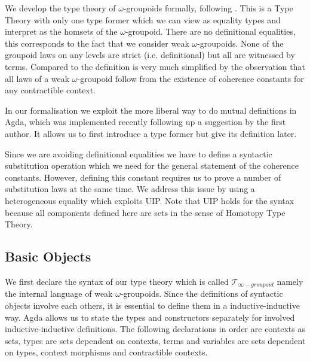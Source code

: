 \documentclass{acm_proc_article-sp}
\newcommand{\wog}{weak $\omega$-groupoids}
\newcommand{\tig}{$\mathcal{T}_{\infty-groupoid}$}
\begin{document}
We develop the type theory of $\omega$-groupoids formally, following
\cite{gb:wog}. This is a Type Theory with only one type former which
we can view as equality types and interpret as the homsets of the
$\omega$-groupoid. There are no definitional equalities, this
corresponds to the fact that we consider weak $\omega$-groupoids. None of the groupoid laws on any levels are strict (i.e. definitional) but all are witnessed by
terms. Compared to \cite{txa:csl} the definition is very much
simplified by the observation that all laws of a weak $\omega$-groupoid follow from the existence of coherence constants for
any contractible context.

In our formalisation we exploit the more liberal way to do mutual
definitions in Agda, which was implemented recently following up a
suggestion by the first author. It allows us to first introduce a type
former but give its definition later.

Since we are avoiding definitional equalities we have to define a
syntactic substitution operation which we need for the general
statement of the coherence constants. However, defining this constant
requires us to prove a number of substitution laws at the same
time. We address this issue by using a heterogeneous equality which
exploits UIP. Note that UIP holds for
the syntax because all components defined here
are sets in the sense of Homotopy Type Theory.



\subsection{Basic Objects}

We first declare the syntax of our type theory which is
called \tig{} namely the internal language of \wog. Since the definitions of syntactic objects involve each others, it is essential to define them in a inductive-inductive way. Agda allows us to state the types and constructors separately for involved inductive-inductive definitions. The following declarations in order are contexts as sets,
types are sets dependent on contexts, terms and variables are sets
dependent on types, context morphisms and contractible contexts.
\end{document}
